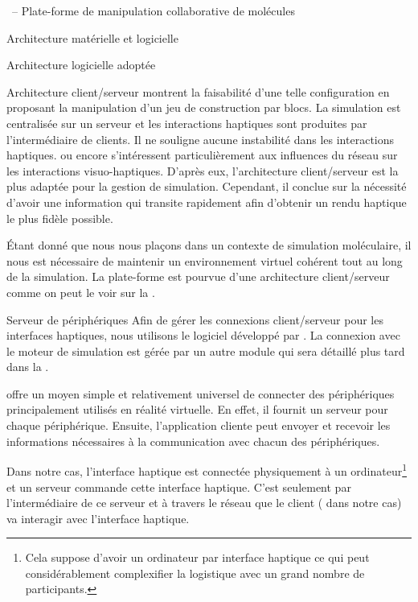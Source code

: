 \documentclass[myfrancais,ngerman,english,frenchb]{mythesis}
\begin{document}
\begin{mychapter}{\myShaddock\ -- Plate-forme de manipulation collaborative de molécules}
\begin{mysection}{Architecture matérielle et logicielle}
\begin{mysubsection}{Architecture logicielle adoptée}
\begin{mysubsubsection}{Architecture client/serveur}
					 montrent la faisabilité d'une telle configuration en proposant la manipulation d'un jeu de construction par blocs.
					La simulation est centralisée sur un serveur et les interactions haptiques sont produites par l'intermédiaire de clients.
					Il ne souligne aucune instabilité dans les interactions haptiques.
					 ou encore  s'intéressent particulièrement aux influences du réseau sur les interactions visuo-haptiques.
					D'après eux, l'architecture client/serveur est la plus adaptée pour la gestion de simulation.
					Cependant, il conclue sur la nécessité d'avoir une information qui transite rapidement afin d'obtenir un rendu haptique le plus fidèle possible.

					Étant donné que nous nous plaçons dans un contexte de simulation moléculaire, il nous est nécessaire de maintenir un environnement virtuel cohérent tout au long de la simulation.
					La plate-forme \myShaddock est pourvue d'une architecture client/serveur comme on peut le voir sur la .
				\end{mysubsubsection}
				\begin{mysubsubsection}{Serveur de périphériques}
					Afin de gérer les connexions client/serveur pour les interfaces haptiques, nous utilisons le logiciel  développé par .
					La connexion avec le moteur de simulation est gérée par un autre module qui sera détaillé plus tard dans la .

					 offre un moyen simple et relativement universel de connecter des périphériques principalement utilisés en réalité virtuelle.
					En effet, il fournit un serveur pour chaque périphérique.
					Ensuite, l'application cliente peut envoyer et recevoir les informations nécessaires à la communication avec chacun des périphériques.

					Dans notre cas, l'interface haptique est connectée physiquement à un ordinateur\footnote{Cela suppose d'avoir un ordinateur par interface haptique ce qui peut considérablement complexifier la logistique avec un grand nombre de participants.} et un serveur  commande cette interface haptique.
					C'est seulement par l'intermédiaire de ce serveur  et à travers le réseau que le client ( dans notre cas) va interagir avec l'interface haptique.


\end{mysubsubsection}
\end{mysubsection}
\end{mysection}
\end{mychapter}
\end{document}
